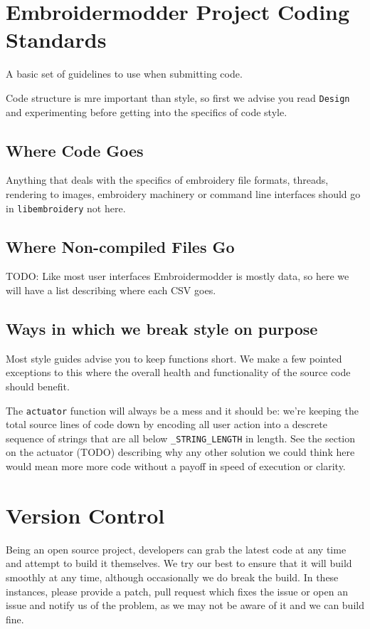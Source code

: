 \documentclass[10pt]{report}
\begin{document}
\section{Embroidermodder Project Coding Standards}

A basic set of guidelines to use when submitting code.

Code structure is mre important than style, so first we advise you read
\texttt{Design} and experimenting before getting into the specifics of code style.

\subsection{Where Code Goes}

Anything that deals with the specifics of embroidery file formats, threads,
rendering to images, embroidery machinery or command line interfaces should go 
in \texttt{libembroidery} not here.

\subsection{Where Non-compiled Files Go}

TODO:
   Like most user interfaces Embroidermodder is mostly data,
   so here we will have a list describing where each CSV goes.

\subsection{Ways in which we break style on purpose}

Most style guides advise you to keep functions short. We make a few pointed
exceptions to this where the overall health and functionality of the source code should benefit.

The \texttt{actuator} function will always be a mess and it should be: we're keeping
the total source lines of code down by encoding all user action into a descrete
sequence of strings that are all below \texttt{\_STRING\_LENGTH} in length. See
the section on the actuator (TODO) describing why any other solution we could
think  here would mean more more code without a payoff in speed of execution or
clarity.

\section{Version Control}

Being an open source project, developers can grab the latest code at any time and attempt to build it themselves. We try our best to ensure that it will build smoothly at any time, although occasionally we do break the build. In these instances, please provide a patch, pull request which fixes the issue or open an issue and notify us of the problem, as we may not be aware of it and we can build fine.
\end{document}
